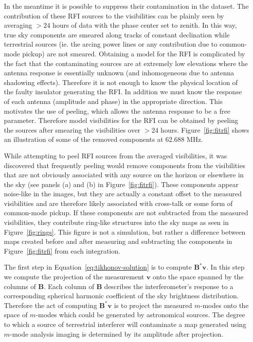 \documentclass[twocolumn]{aastex61}
\renewcommand{\b}{\pmb}
\begin{document}
In the meantime it is possible to suppress their contamination in the dataset. The contribution of
these RFI sources to the visibilities can be plainly seen by averaging $>24$ hours of data with the
phase center set to zenith. In this way, true sky components are smeared along tracks of constant
declination while terrestrial sources (ie. the arcing power lines or any contribution due to
common-mode pickup) are not smeared.  Obtaining a model for the RFI is complicated by the fact that
the contaminating sources are at extremely low elevations where the antenna response is essentially
unknown (and inhomogeneous due to antenna shadowing effects). Therefore it is not enough to know the
physical location of the faulty insulator generating the RFI. In addition we must know the response
of each antenna (amplitude and phase) in the appropriate direction. This motivates the use of
peeling, which allows the antenna response to be a free parameter.  Therefore model visibilities for
the RFI can be obtained by peeling the sources after smearing the visibilities over $>24$ hours.
Figure~\ref{fig:fitrfi} shows an illustration of some of the removed components at 62.688 MHz.

While attempting to peel RFI sources from the averaged visibilities, it was discovered that
frequently peeling would remove components from the visibilities that are not obviously associated
with any source on the horizon or elsewhere in the sky (see panels (a) and (b) in
Figure~\ref{fig:fitrfi}).  These components appear noise-like in the images, but they are actually a
constant offset to the measured visibilities and are therefore likely associated with cross-talk or
some form of common-mode pickup. If these components are not subtracted from the measured
visibilities, they contribute ring-like structures into the sky maps as seen in
Figure~\ref{fig:rings}. This figure is not a simulation, but rather a difference between maps
created before and after measuring and subtracting the components in Figure~\ref{fig:fitrfi} from
each integration.

The first step in Equation~\ref{eq:tikhonov-solution} is to compute $\b B^*\b v$. In this step we
compute the projection of the measurement $\b v$ onto the space spanned by the columns of $\b B$.
Each column of $\b B$ describes the interferometer's response to a corresponding spherical harmonic
coefficient of the sky brightness distribution. Therefore the act of computing $\b B^*\b v$ is to
project the measured $m$-modes onto the space of $m$-modes which could be generated by astronomical
sources. The degree to which a source of terrestrial interferer will contaminate a map generated
using $m$-mode analysis imaging is determined by its amplitude after projection.
\end{document}
